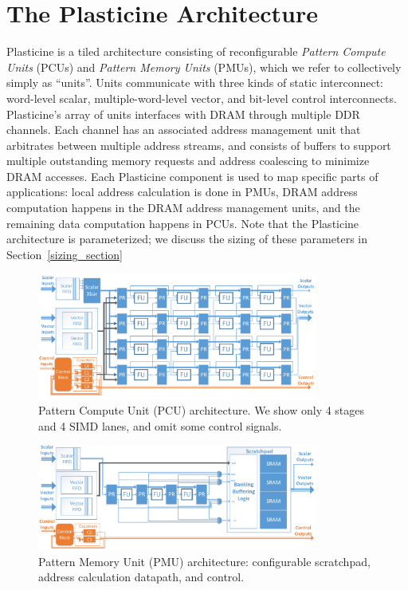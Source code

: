 \section{The Plasticine Architecture}
\label{plasticine}
Plasticine is a tiled architecture consisting of reconfigurable \emph{Pattern
Compute Units} (PCUs) and \emph{Pattern Memory Units} (PMUs), which we refer to collectively simply as ``units''. Units communicate with three kinds of static
interconnect: word-level scalar, multiple-word-level vector, and bit-level control interconnects.
Plasticine's array of units interfaces with DRAM through multiple DDR channels. Each channel has an associated
address management unit that arbitrates between multiple address streams, and consists of buffers
to support multiple outstanding memory requests and address coalescing to minimize DRAM accesses.
Each Plasticine component is used to map specific parts of applications: local address calculation is done in PMUs, DRAM address computation happens in the DRAM address management units, and the remaining data computation happens in PCUs.
Note that the Plasticine architecture is parameterized; we discuss the sizing of these parameters in Section~\ref{sizing_section}

\begin{figure}[ht]
  \centering
  \includegraphics[width=0.82\textwidth]{figs/plasticineV2_simple.pdf}
  \vspace{-10pt}
  \caption{Pattern Compute Unit (PCU) architecture. We show only 4 stages and 4 SIMD lanes, and omit some control signals.
  \vspace{3pt}
}\label{fig:pcu}
\end{figure}

\begin{figure}[ht]
\centering
\includegraphics[width=0.82\textwidth]{figs/pmu.pdf}
  \vspace{-10pt}
  \caption{Pattern Memory Unit (PMU) architecture: configurable scratchpad, address calculation datapath, and control.}
  \label{fig:pmu}
  \vspace{3pt}
\end{figure}

